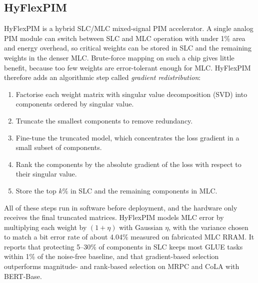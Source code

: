 \documentclass[conference]{IEEEtran}
\begin{document}
\subsection{HyFlexPIM}
HyFlexPIM \cite{song2025hyflexpim} is a hybrid SLC/MLC mixed-signal PIM accelerator. A single analog PIM
module can switch between SLC and MLC operation with under 1\% area and energy overhead, so critical
weights can be stored in SLC and the remaining weights in the denser MLC. Brute-force mapping on such a chip
gives little benefit, because too few weights are error-tolerant enough for MLC. HyFlexPIM therefore adds an
algorithmic step called \emph{gradient redistribution}:
\begin{enumerate}
\item Factorise each weight matrix with singular value decomposition (SVD) into components ordered by
singular value.
\item Truncate the smallest components to remove redundancy.
\item Fine-tune the truncated model, which concentrates the loss gradient in a small subset of components.
\item Rank the components by the absolute gradient of the loss with respect to their singular value.
\item Store the top $k\%$ in SLC and the remaining components in MLC.
\end{enumerate}
All of these steps run in software before deployment, and the hardware only receives the final truncated
matrices. HyFlexPIM models MLC error by multiplying each weight by $(1+\eta)$ with Gaussian $\eta$, with the
variance chosen to match a bit error rate of about 4.04\% measured on fabricated MLC RRAM. It reports that
protecting 5--30\% of components in SLC keeps most GLUE tasks within 1\% of the noise-free baseline, and that
gradient-based selection outperforms magnitude- and rank-based selection on MRPC and CoLA with BERT-Base.
\end{document}
